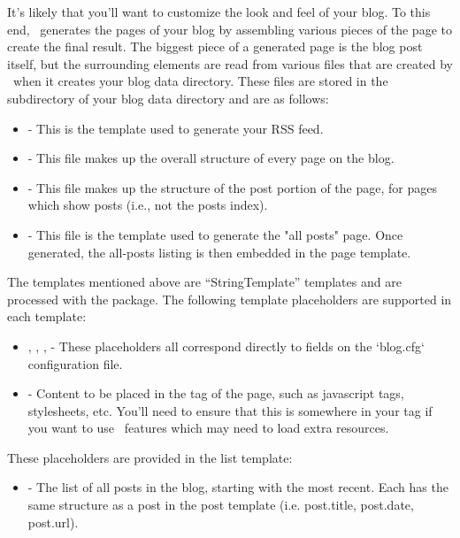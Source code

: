 \documentclass[11pt, letterpaper, oneside, titlepage]{book}
\begin{document}
It's likely that you'll want to customize the look and feel of your
blog.  To this end, \mathblog\ generates the pages of your blog by
assembling various pieces of the page to create the final result.  The
biggest piece of a generated page is the blog post itself, but the
surrounding elements are read from various files that are created by
\mathblog\ when it creates your blog data directory.  These files are
stored in the  subdirectory of your blog data directory
and are as follows:

\begin{itemize}
\item{ - This is the template used to
  generate your RSS feed.}
\item{ - This file makes up the
  overall structure of every page on the blog.}
\item{ - This file makes up the
  structure of the post portion of the page, for pages which show
  posts (i.e., not the posts index).}
\item{ - This file is the template
  used to generate the "all posts" page.  Once generated, the
  all-posts listing is then embedded in the page template.}
\end{itemize}

The templates mentioned above are ``StringTemplate'' templates and are
processed with the  package.  The following
template placeholders are supported in each template:

\begin{itemize}
\item{, , ,
   - These placeholders all correspond directly to
  fields on the `blog.cfg` configuration file.}
\item{ - Content to be placed in the 
  tag of the page, such as javascript tags, stylesheets, etc.  You'll
  need to ensure that this is somewhere in your  tag if you
  want to use \mathblog\ features which may need to load extra
  resources.}
\end{itemize}

These placeholders are provided in the list template:

\begin{itemize}
\item{ - The list of all posts in the blog, starting with
  the most recent.  Each has the same structure as a post in the post
  template (i.e. post.title, post.date, post.url).}
\end{itemize}
\end{document}
